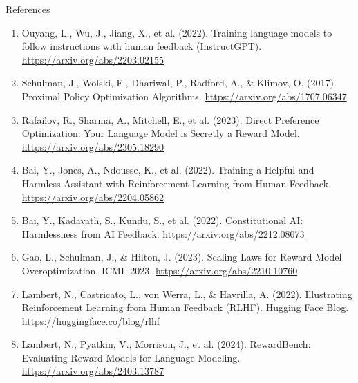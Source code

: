 \begin{frame}{References}
  \scriptsize
  \begin{enumerate}
    \item Ouyang, L., Wu, J., Jiang, X., et al. (2022). Training language models to follow instructions with human feedback (InstructGPT). \href{https://arxiv.org/abs/2203.02155}{https://arxiv.org/abs/2203.02155}
    \item Schulman, J., Wolski, F., Dhariwal, P., Radford, A., \& Klimov, O. (2017). Proximal Policy Optimization Algorithms. \href{https://arxiv.org/abs/1707.06347}{https://arxiv.org/abs/1707.06347}
    \item Rafailov, R., Sharma, A., Mitchell, E., et al. (2023). Direct Preference Optimization: Your Language Model is Secretly a Reward Model. \href{https://arxiv.org/abs/2305.18290}{https://arxiv.org/abs/2305.18290}
    \item Bai, Y., Jones, A., Ndousse, K., et al. (2022). Training a Helpful and Harmless Assistant with Reinforcement Learning from Human Feedback. \href{https://arxiv.org/abs/2204.05862}{https://arxiv.org/abs/2204.05862}
    \item Bai, Y., Kadavath, S., Kundu, S., et al. (2022). Constitutional AI: Harmlessness from AI Feedback. \href{https://arxiv.org/abs/2212.08073}{https://arxiv.org/abs/2212.08073}
    \item Gao, L., Schulman, J., \& Hilton, J. (2023). Scaling Laws for Reward Model Overoptimization. ICML 2023. \href{https://arxiv.org/abs/2210.10760}{https://arxiv.org/abs/2210.10760}
    \item Lambert, N., Castricato, L., von Werra, L., \& Havrilla, A. (2022). Illustrating Reinforcement Learning from Human Feedback (RLHF). Hugging Face Blog. \href{https://huggingface.co/blog/rlhf}{https://huggingface.co/blog/rlhf}
    \item Lambert, N., Pyatkin, V., Morrison, J., et al. (2024). RewardBench: Evaluating Reward Models for Language Modeling. \href{https://arxiv.org/abs/2403.13787}{https://arxiv.org/abs/2403.13787}
  \end{enumerate}
\end{frame}

